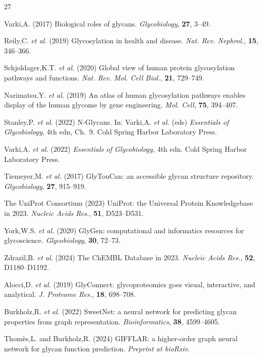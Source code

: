 \documentclass[11pt,a4paper]{article}
\begin{document}
\begin{thebibliography}{27}

Varki,A. (2017) Biological roles of glycans. \textit{Glycobiology}, \textbf{27}, 3--49.

Reily,C. \textit{et al.} (2019) Glycosylation in health and disease. \textit{Nat. Rev. Nephrol.}, \textbf{15}, 346--366.

Schjoldager,K.T. \textit{et al.} (2020) Global view of human protein glycosylation pathways and functions. \textit{Nat. Rev. Mol. Cell Biol.}, \textbf{21}, 729--749.

Narimatsu,Y. \textit{et al.} (2019) An atlas of human glycosylation pathways enables display of the human glycome by gene engineering. \textit{Mol. Cell}, \textbf{75}, 394--407.

Stanley,P. \textit{et al.} (2022) N-Glycans. In: Varki,A. \textit{et al.} (eds) \textit{Essentials of Glycobiology}, 4th edn, Ch.~9. Cold Spring Harbor Laboratory Press.

Varki,A. \textit{et al.} (2022) \textit{Essentials of Glycobiology}, 4th edn. Cold Spring Harbor Laboratory Press.

Tiemeyer,M. \textit{et al.} (2017) GlyTouCan: an accessible glycan structure repository. \textit{Glycobiology}, \textbf{27}, 915--919.

The UniProt Consortium (2023) UniProt: the Universal Protein Knowledgebase in 2023. \textit{Nucleic Acids Res.}, \textbf{51}, D523--D531.

York,W.S. \textit{et al.} (2020) GlyGen: computational and informatics resources for glycoscience. \textit{Glycobiology}, \textbf{30}, 72--73.

Zdrazil,B. \textit{et al.} (2024) The ChEMBL Database in 2023. \textit{Nucleic Acids Res.}, \textbf{52}, D1180--D1192.

Alocci,D. \textit{et al.} (2019) GlyConnect: glycoproteomics goes visual, interactive, and analytical. \textit{J. Proteome Res.}, \textbf{18}, 698--708.

Burkholz,R. \textit{et al.} (2022) SweetNet: a neural network for predicting glycan properties from graph representation. \textit{Bioinformatics}, \textbf{38}, 4599--4605.

Thom\`es,L. and Burkholz,R. (2024) GIFFLAR: a higher-order graph neural network for glycan function prediction. \textit{Preprint at bioRxiv}.


\end{thebibliography}
\end{document}
